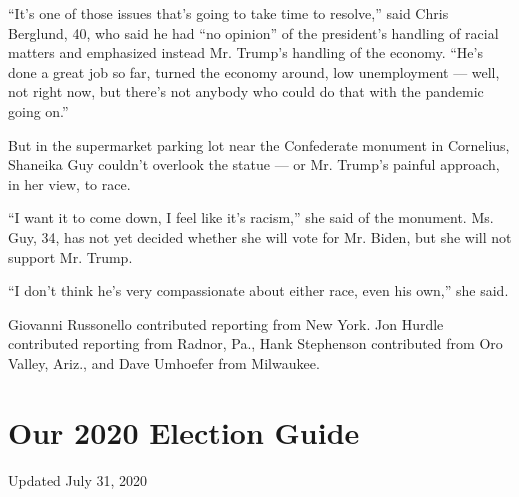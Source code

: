 ``It's one of those issues that's going to take time to resolve,'' said
Chris Berglund, 40, who said he had ``no opinion'' of the president's
handling of racial matters and emphasized instead Mr. Trump's handling
of the economy. ``He's done a great job so far, turned the economy
around, low unemployment --- well, not right now, but there's not
anybody who could do that with the pandemic going on.''

But in the supermarket parking lot near the Confederate monument in
Cornelius, Shaneika Guy couldn't overlook the statue --- or Mr. Trump's
painful approach, in her view, to race.

``I want it to come down, I feel like it's racism,'' she said of the
monument. Ms. Guy, 34, has not yet decided whether she will vote for Mr.
Biden, but she will not support Mr. Trump.

``I don't think he's very compassionate about either race, even his
own,'' she said.

Giovanni Russonello contributed reporting from New York. Jon Hurdle
contributed reporting from Radnor, Pa., Hank Stephenson contributed from
Oro Valley, Ariz., and Dave Umhoefer from Milwaukee.

\hypertarget{our-2020-election-guide}{%
\section{Our 2020 Election Guide}\label{our-2020-election-guide}}

Updated July 31, 2020

